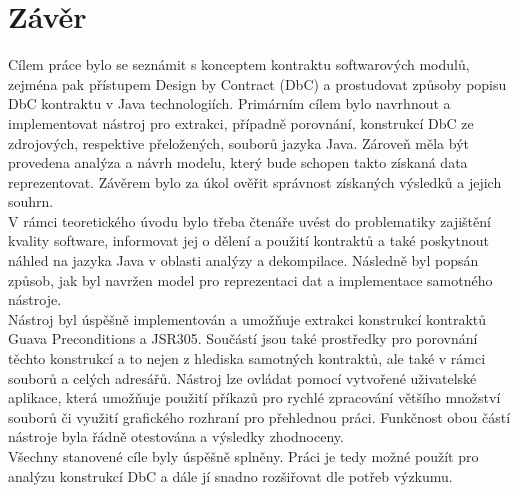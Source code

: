 \chapter{Závěr}	
	Cílem práce bylo se seznámit s konceptem kontraktu softwarových modulů, zejména pak přístupem Design by Contract (DbC) a prostudovat způsoby popisu DbC kontraktu v Java technologiích. Primárním cílem bylo navrhnout a implementovat nástroj pro extrakci, případně porovnání, konstrukcí DbC ze zdrojových, respektive přeložených, souborů jazyka Java. Zároveň měla být provedena analýza a návrh modelu, který bude schopen takto získaná data reprezentovat. Závěrem bylo za úkol ověřit správnost získaných výsledků a jejich souhrn.\\
	
	V rámci teoretického úvodu bylo třeba čtenáře uvést do problematiky zajištění kvality software, informovat jej o dělení a použití kontraktů a také poskytnout náhled na jazyka Java v oblasti analýzy a dekompilace. Následně byl popsán způsob, jak byl navržen model pro reprezentaci dat a implementace samotného nástroje.\\	
	
	Nástroj byl úspěšně implementován a umožňuje extrakci konstrukcí kontraktů Guava Preconditions a JSR305. Součástí jsou také prostředky pro porovnání těchto konstrukcí a to nejen z hlediska samotných kontraktů, ale také v rámci souborů a celých adresářů. Nástroj lze ovládat pomocí vytvořené uživatelské aplikace, která umožňuje použití příkazů pro rychlé zpracování většího množství souborů či využití grafického rozhraní pro přehlednou práci. Funkčnost obou částí nástroje byla řádně otestována a výsledky zhodnoceny.\\
	
	Všechny stanovené cíle byly úspěšně splněny. Práci je tedy možné použít pro analýzu konstrukcí DbC a dále jí snadno rozšiřovat dle potřeb výzkumu.